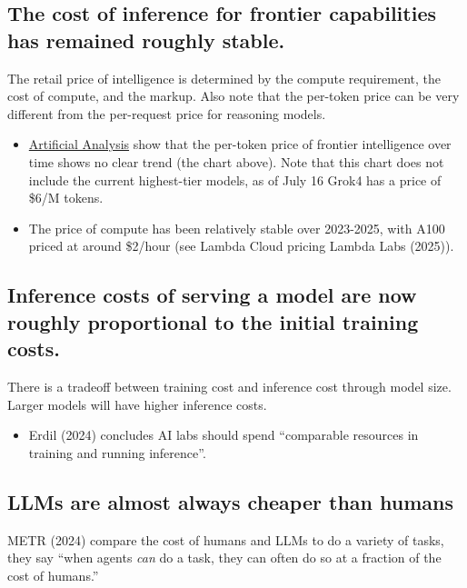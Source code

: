 \documentclass[
  letterpaper,
  DIV=11,
  numbers=noendperiod,
  oneside]{scrartcl}
\providecommand{\tightlist}{%
  \setlength{\itemsep}{0pt}\setlength{\parskip}{0pt}}
\begin{document}
\subsection{The cost of inference for frontier capabilities has remained
roughly
stable.}\label{the-cost-of-inference-for-frontier-capabilities-has-remained-roughly-stable.}

The retail price of intelligence is determined by the compute
requirement, the cost of compute, and the markup. Also note that the
per-token price can be very different from the per-request price for
reasoning models.

\begin{itemize}
\item
  \href{https://artificialanalysis.ai/trends}{Artificial Analysis} show
  that the per-token price of frontier intelligence over time shows no
  clear trend (the chart above). Note that this chart does not include
  the current highest-tier models, as of July 16 Grok4 has a price of
  \$6/M tokens.
\item
  The price of compute has been relatively stable over 2023-2025, with
  A100 priced at around \$2/hour (see Lambda Cloud pricing Lambda Labs
  (2025)).
\end{itemize}

\subsection{Inference costs of serving a model are now roughly
proportional to the initial training
costs.}\label{inference-costs-of-serving-a-model-are-now-roughly-proportional-to-the-initial-training-costs.}

There is a tradeoff between training cost and inference cost through
model size. Larger models will have higher inference costs.

\begin{itemize}
\tightlist
\item
  Erdil (2024) concludes AI labs should spend ``comparable resources in
  training and running inference''.
\end{itemize}

\subsection{LLMs are almost always cheaper than
humans}\label{llms-are-almost-always-cheaper-than-humans}

METR (2024) compare the cost of humans and LLMs to do a variety of
tasks, they say ``when agents \emph{can} do a task, they can often do so
at a fraction of the cost of humans.''
\end{document}
